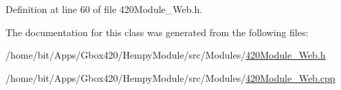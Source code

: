 Definition at line 60 of file 420\+Module\+\_\+\+Web.\+h.



The documentation for this class was generated from the following files\+:\begin{DoxyCompactItemize}
\item 
/home/bit/\+Apps/\+Gbox420/\+Hempy\+Module/src/\+Modules/\hyperlink{_hempy_module_2src_2_modules_2420_module___web_8h}{420\+Module\+\_\+\+Web.\+h}\item 
/home/bit/\+Apps/\+Gbox420/\+Hempy\+Module/src/\+Modules/\hyperlink{_hempy_module_2src_2_modules_2420_module___web_8cpp}{420\+Module\+\_\+\+Web.\+cpp}\end{DoxyCompactItemize}
